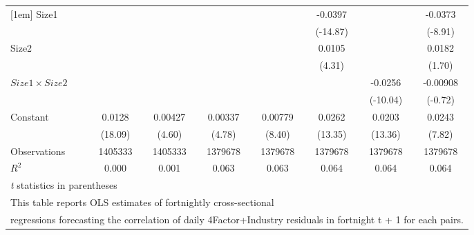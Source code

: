 {\begin{tabular}{l*{7}{c}}
[1em]
Size1               &                     &                     &                     &                     &     -0.0397\sym{***}&                     &     -0.0373\sym{***}\\
                    &                     &                     &                     &                     &    (-14.87)         &                     &     (-8.91)         \\
[1em]
Size2               &                     &                     &                     &                     &      0.0105\sym{***}&                     &      0.0182         \\
                    &                     &                     &                     &                     &      (4.31)         &                     &      (1.70)         \\
[1em]
$ Size1 \times Size2 $&                     &                     &                     &                     &                     &     -0.0256\sym{***}&    -0.00908         \\
                    &                     &                     &                     &                     &                     &    (-10.04)         &     (-0.72)         \\
[1em]
Constant            &      0.0128\sym{***}&     0.00427\sym{***}&     0.00337\sym{***}&     0.00779\sym{***}&      0.0262\sym{***}&      0.0203\sym{***}&      0.0243\sym{***}\\
                    &     (18.09)         &      (4.60)         &      (4.78)         &      (8.40)         &     (13.35)         &     (13.36)         &      (7.82)         \\
\hline
Observations        &     1405333         &     1405333         &     1379678         &     1379678         &     1379678         &     1379678         &     1379678         \\
\(R^{2}\)           &       0.000         &       0.001         &       0.063         &       0.063         &       0.064         &       0.064         &       0.064         \\
\hline\hline
\multicolumn{8}{l}{\footnotesize \textit{t} statistics in parentheses}\\
\multicolumn{8}{l}{\footnotesize This table reports OLS estimates of fortnightly cross-sectional}\\
\multicolumn{8}{l}{\footnotesize  regressions forecasting the correlation of daily 4Factor+Industry residuals in fortnight t + 1 for each pairs.}\\

\end{tabular}}
